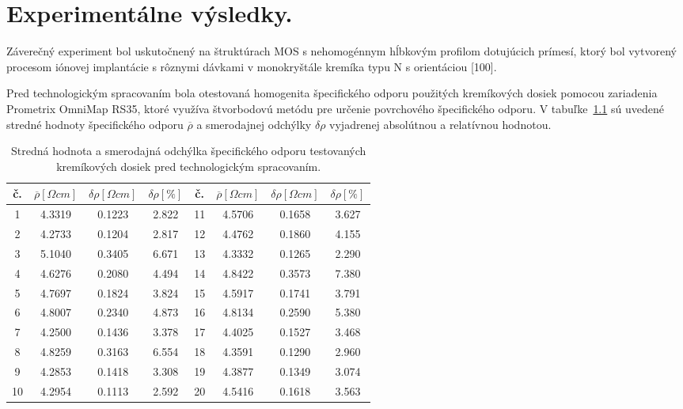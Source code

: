 \chapter{Experimentálne výsledky.}\label{Chapter7}

Záverečný experiment bol uskutočnený na štruktúrach MOS s nehomogénnym
hĺbkovým profilom dotujúcich prímesí, ktorý bol vytvorený procesom
iónovej implantácie s rôznymi dávkami v monokryštále kremíka typu N s
orientáciou [100].

Pred technologickým spracovaním bola otestovaná homogenita
špecifického odporu použitých kremíkových dosiek pomocou zariadenia
Prometrix OmniMap RS35, ktoré využíva štvorbodovú metódu pre určenie
povrchového špecifického odporu. V tabuľke~\ref{tab:7.1} sú uvedené
stredné hodnoty špecifického odporu $\overline\rho$ a smerodajnej
odchýlky $\delta\rho$ vyjadrenej absolútnou a relatívnou hodnotou.

\begin{table}[h!]\centering
  \begin{tabular}{c c c c c c c c}
    č. & $\overline\rho[\Omega cm]$ & $\delta\rho[\Omega cm]$ & $\delta\rho[\%]$ &
    č. & $\overline\rho[\Omega cm]$ & $\delta\rho[\Omega cm]$ & $\delta\rho[\%]$\\
    \hline%
    1  & 4.3319 & 0.1223 & 2.822 & 11 & 4.5706 & 0.1658 & 3.627\\
    2  & 4.2733 & 0.1204 & 2.817 & 12 & 4.4762 & 0.1860 & 4.155\\
    3  & 5.1040 & 0.3405 & 6.671 & 13 & 4.3332 & 0.1265 & 2.290\\
    4  & 4.6276 & 0.2080 & 4.494 & 14 & 4.8422 & 0.3573 & 7.380\\
    5  & 4.7697 & 0.1824 & 3.824 & 15 & 4.5917 & 0.1741 & 3.791\\
    6  & 4.8007 & 0.2340 & 4.873 & 16 & 4.8134 & 0.2590 & 5.380\\
    7  & 4.2500 & 0.1436 & 3.378 & 17 & 4.4025 & 0.1527 & 3.468\\
    8  & 4.8259 & 0.3163 & 6.554 & 18 & 4.3591 & 0.1290 & 2.960\\
    9  & 4.2853 & 0.1418 & 3.308 & 19 & 4.3877 & 0.1349 & 3.074\\
    10 & 4.2954 & 0.1113 & 2.592 & 20 & 4.5416 & 0.1618 & 3.563\\
  \end{tabular}
  \caption[Stredná hodnota a smerodajná odchýlka špecifického odporu
    testovaných kremíkových dosiek pred technologickým
    spracovaním]{Stredná hodnota a smerodajná odchýlka špecifického
    odporu testovaných kremíkových dosiek pred technologickým
    spracovaním.}\label{tab:7.1}
\end{table}

